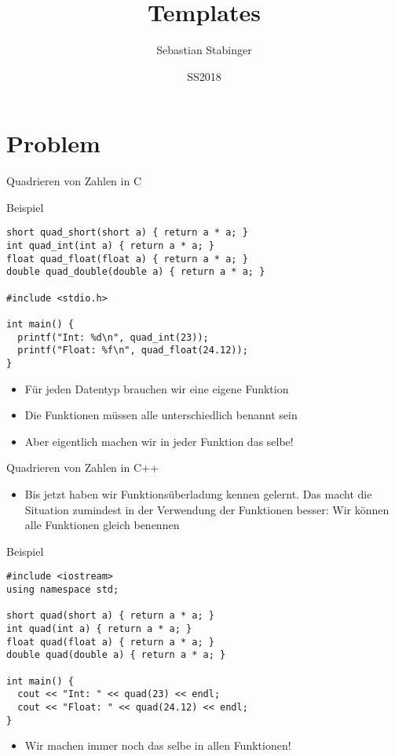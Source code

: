 \documentclass[presentation]{beamer}
\author{Sebastian Stabinger}
\date{SS2018}
\title{Templates}
\begin{document}
\maketitle

\section{Problem}
\label{sec:org6326c27}
\begin{frame}[fragile,label={sec:orgba591d7}]{Quadrieren von Zahlen in C}
 \begin{exampleblock}{Beispiel}
\begin{verbatim}
short quad_short(short a) { return a * a; }
int quad_int(int a) { return a * a; }
float quad_float(float a) { return a * a; }
double quad_double(double a) { return a * a; }

#include <stdio.h>

int main() {
  printf("Int: %d\n", quad_int(23));
  printf("Float: %f\n", quad_float(24.12));
}
\end{verbatim}
\end{exampleblock}
\begin{itemize}
\item Für jeden Datentyp brauchen wir eine eigene Funktion
\item Die Funktionen müssen alle unterschiedlich benannt sein
\item Aber eigentlich machen wir \alert{in jeder Funktion das selbe}!
\end{itemize}
\end{frame}
\begin{frame}[fragile,label={sec:org6bd6171}]{Quadrieren von Zahlen in C++}
 \begin{itemize}
\item Bis jetzt haben wir \alert{Funktionsüberladung} kennen gelernt. Das macht
die Situation zumindest in der Verwendung der Funktionen besser: Wir
können \alert{alle Funktionen gleich benennen}
\end{itemize}
\begin{exampleblock}{Beispiel}
\begin{verbatim}
#include <iostream>
using namespace std;

short quad(short a) { return a * a; }
int quad(int a) { return a * a; }
float quad(float a) { return a * a; }
double quad(double a) { return a * a; }

int main() {
  cout << "Int: " << quad(23) << endl;
  cout << "Float: " << quad(24.12) << endl;
}
\end{verbatim}
\end{exampleblock}
\begin{itemize}
\item Wir machen \alert{immer noch das selbe} in allen Funktionen!
\end{itemize}
\end{frame}
\end{document}

